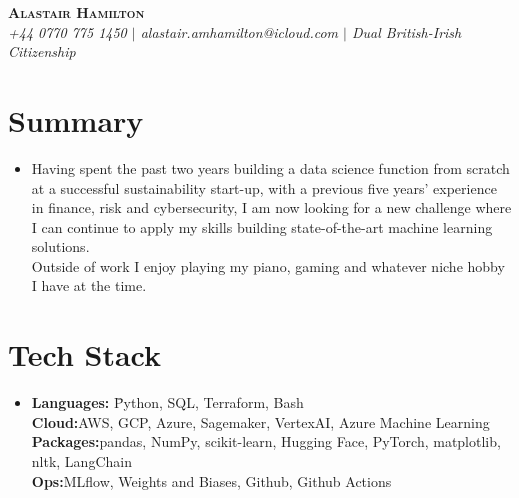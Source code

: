\documentclass[letterpaper,11pt]{article}
\begin{document}
\vspace{-5pt}

\begin{center}
    \textbf{\Huge \scshape Alastair Hamilton} \\
    \textit{\small +44 0770 775 1450 $|$ alastair.amhamilton@icloud.com $|$ Dual British-Irish Citizenship}
    \vspace{8pt} 
\end{center}

\section{Summary}
\begin{itemize}[leftmargin=0.2in, label={}]
    \item 
        \begin{minipage}[t]{1.0\linewidth}
            Having spent the past two years building a data science function
            from scratch at a successful sustainability start-up, with a previous
            five years' experience in finance, risk and cybersecurity,
            I am now looking for a new challenge where I can continue to apply
            my skills building state-of-the-art machine learning solutions. \\
            Outside of work I enjoy playing my piano, gaming and 
            whatever niche hobby I have at the time.
        \end{minipage}
\end{itemize}

\section{Tech Stack}
\begin{itemize}[leftmargin=0.2in, label={}]
    \item 
        \begin{minipage}[t]{1.0\linewidth}
            \begin{tabbing}
            \textbf{Languages:}  \=Python, SQL, Terraform, Bash \\
            \textbf{Cloud:}\>AWS, GCP, Azure, Sagemaker, VertexAI, 
            Azure Machine Learning \\
            \textbf{Packages:}\>pandas, NumPy, scikit-learn, Hugging
            Face, PyTorch, matplotlib, nltk, LangChain \\
            \textbf{Ops:}\>MLflow, Weights and Biases, Github, 
            Github Actions
            \end{tabbing} 
        \end{minipage}
\end{itemize}
\end{document}
